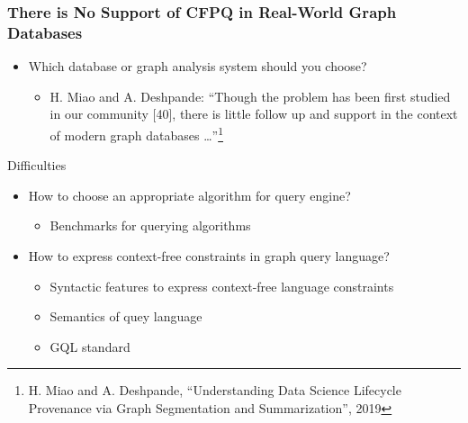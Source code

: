 \documentclass[xcolor=table,aspectratio=169]{beamer}
\begin{document}
\begin{frame}[fragile]
  \frametitle{There is No Support of CFPQ in Real-World Graph Databases}
  \begin{itemize}        
    \item[\faQuestion] Which database or graph analysis system should you choose?  
    \begin{itemize}
      \item[\faFrown] H. Miao and A. Deshpande: ``Though the problem has been first studied in our community [40], there is little follow up and support in the context of modern graph databases \dots''\footnote{H. Miao and A. Deshpande,  ``Understanding Data Science Lifecycle Provenance via Graph Segmentation and Summarization'', 2019}       
    \end{itemize}
  \end{itemize}
  \pause
  \vfill
  Difficulties
  \begin{itemize}        
    \item[\faQuestion] How to choose an appropriate algorithm for query engine?
    \begin{itemize}
      \item[\faGears] Benchmarks for querying algorithms
    \end{itemize}
    \item[\faQuestion] How to express context-free constraints in graph query language? 
    \begin{itemize}
      \item[\faQuestion] Syntactic features to express context-free language constraints
      \item[\faQuestion] Semantics of quey language
      \pause 
      \item[\faGears] GQL standard  
    \end{itemize}
  \end{itemize}  
\end{frame}
\end{document}
